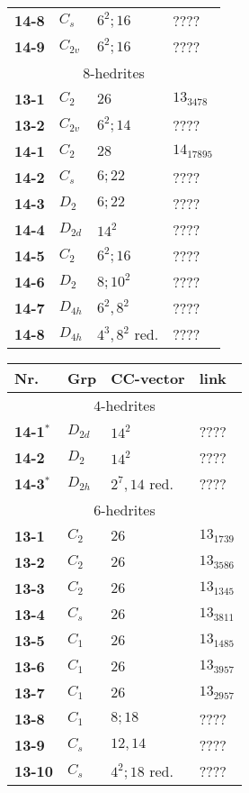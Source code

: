 \documentclass[12pt]{article}
\begin{document}
\begin{remark!!}
\begin{table}
\begin{center}
{\begin{minipage}{7cm}
\begin{tabular}{||l|l|l|l||}
{\bf 14-8}	&$C_s$	&$6^2; 16$	&????\\
{\bf 14-9}	&$C_{2v}$	&$6^2; 16$	&????\\\hline
\hline
\multicolumn{4}{||c||}{$8$-hedrites}\\\hline
{\bf 13-1}	&$C_2$	&$26$		&$13_{3478}$\\
{\bf 13-2}	&$C_{2v}$	&$6^2; 14$	&????\\\hline
{\bf 14-1}	&$C_2$	&$28$		&$14_{17895}$\\
{\bf 14-2}	&$C_s$	&$6; 22$		&????\\
{\bf 14-3}	&$D_2$	&$6; 22$		&????\\
{\bf 14-4}	&$D_{2d}$	&$14^2$		&????\\
{\bf 14-5}	&$C_2$	&$6^2; 16$	&????\\
{\bf 14-6}	&$D_2$	&$8; 10^2$	&????\\
{\bf 14-7}	&$D_{4h}$	&$6^2, 8^2$	&????\\
{\bf 14-8}	&$D_{4h}$	&$4^3, 8^2$ red.	&????\\\hline
\end{tabular}
\end{minipage}
\begin{minipage}[t]{7cm}
\begin{tabular}{||l|l|l|l||}
\hline
Nr.	&Grp 	&CC-vector	&link\\\hline
\multicolumn{4}{||c||}{$4$-hedrites}\\\hline
{\bf 14-1${}^*$}&$D_{2d}$	&$14^2$		&????\\\hline
{\bf 14-2}	&$D_2$	&$14^2$		&????\\	
{\bf 14-3${}^*$}&$D_{2h}$       &$2^7, 14$ red.  &????\\
\hline
\multicolumn{4}{||c||}{$6$-hedrites}\\\hline
{\bf 13-1}	&$C_2$	&$26$		&$13_{1739}$\\
{\bf 13-2} 	&$C_2$	&$26$		&$13_{3586}$\\
{\bf 13-3} 	&$C_2$	&$26$		&$13_{1345}$\\
{\bf 13-4} 	&$C_s$	&$26$		&$13_{3811}$\\
{\bf 13-5} 	&$C_1$	&$26$		&$13_{1485}$\\
{\bf 13-6}	&$C_1$	&$26$		&$13_{3957}$\\
{\bf 13-7}	&$C_1$	&$26$		&$13_{2957}$\\
{\bf 13-8}	&$C_1$	&$8; 18$		&????\\
{\bf 13-9}	&$C_s$	&$12, 14$		&????\\
{\bf 13-10}	&$C_s$	&$4^2; 18$ red.	&????\\

\end{tabular}
\end{minipage}}
\end{center}
\end{table}
\end{remark!!}
\end{document}
